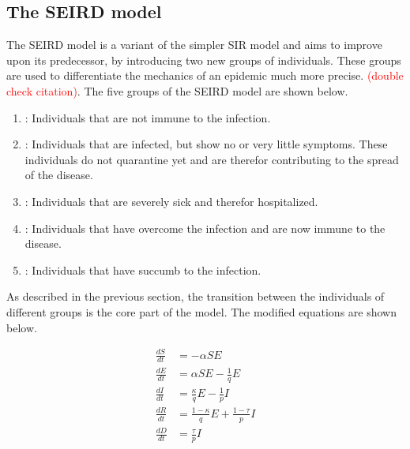 \subsection{The SEIRD model}
\label{sec:SEIRD}
The SEIRD model is a variant of the simpler SIR model\cite{knodel20173d} and aims to improve upon its predecessor, by
introducing two new groups of individuals. These groups are used to differentiate the mechanics of an epidemic much
more precise.
\textcolor{red}{(double check citation)}. %
The five groups of the SEIRD model are shown below.

\begin{enumerate}[label=$\bullet$]
	\item {}: Individuals that are not immune to the infection.
	\item {}: Individuals that are infected, but show no or very little symptoms. These individuals
		do not quarantine yet and are therefor contributing to the spread of the disease.
	\item {}: Individuals that are severely sick and therefor hospitalized.
	\item {}: Individuals that  have overcome the infection and are now immune to the disease.
	\item {}: Individuals that have succumb to the infection.
\end{enumerate}


As described in the previous section, the transition between the individuals of different groups is the core
part of the model. The modified equations are shown below.

\begin{align}
	\frac{dS}{dt} &= -\alpha S E \label{eq:SEIRD1_S} \\
	\frac{dE}{dt} &= \alpha S E -\frac{1}{q} E \label{eq:SEIRD1_E} \\
	\frac{dI}{dt} &= \frac{\kappa}{q} E - \frac{1}{p} I \label{eq:SEIRD1_I} \\
	\frac{dR}{dt} &= \frac{1-\kappa}{q} E + \frac{1-\tau}{p} I \label{eq:SEIRD1_R} \\
	\frac{dD}{dt} &= \frac{\tau}{p} I \label{eq:SEIRD1_D} 
\end{align}

